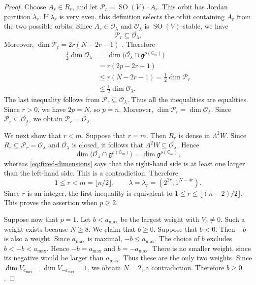 \documentclass[12pt]{article}
\theoremstyle{remark}
\theoremstyle{plain}
\newcommand{\Gm}{\mathbb G_m}
\begin{document}
\begin{proof}
Choose $A_r\in R_r$, and let
$\mathcal P_r=\operatorname{SO}(V)\cdot A_r$. This orbit has Jordan
partition $\lambda_r$. If $\lambda_r$ is very even, this definition
selects the orbit containing $A_r$ from the two possible orbits. Since
$A_r\in\overline{\mathcal O_\lambda}$ and
$\overline{\mathcal O_\lambda}$ is $\operatorname{SO}(V)$-stable, we
have
\[
\mathcal P_r\subseteq\overline{\mathcal O_\lambda}.
\]
Moreover,
$\dim\mathcal P_r=2r(N-2r-1)$ \cite{KP}. Therefore
\[
\begin{aligned}
\frac12\dim\mathcal O_\lambda
&=\dim\bigl(\overline{\mathcal O_\lambda}
\cap\mathfrak g^{\rho(\Gm)}\bigr)\\
&=r(2p-2r-1)\\
&\leq r(N-2r-1)
=\frac12\dim\mathcal P_r\\
&\leq\frac12\dim\mathcal O_\lambda.
\end{aligned}
\]
The last inequality follows from
$\mathcal P_r\subseteq\overline{\mathcal O_\lambda}$. Thus all the
inequalities are equalities. Since $r>0$, we have $2p=N$, so $p=n$.
Moreover,
$\dim\mathcal P_r=\dim\mathcal O_\lambda$. Since
$\mathcal P_r\subseteq\overline{\mathcal O_\lambda}$, we obtain
$\mathcal P_r=\mathcal O_\lambda$.

We next show that $r<m$. Suppose that $r=m$. Then $R_r$ is dense in
$\Lambda^2W$. Since
$R_r\subseteq\mathcal P_r=\mathcal O_\lambda$ and
$\overline{\mathcal O_\lambda}$ is closed, it follows that
$\Lambda^2W\subseteq\overline{\mathcal O_\lambda}$. Hence
\[
\dim\bigl(\overline{\mathcal O_\lambda}
\cap\mathfrak g^{\rho(\Gm)}\bigr)
=\dim\mathfrak g^{\rho(\Gm)},
\]
whereas \eqref{eq:fixed-dimensions} says that the right-hand side is
at least one larger than the left-hand side. This is a contradiction.
Therefore
\[
1\leq r<m=\lfloor n/2\rfloor,
\qquad
\lambda=\lambda_r=(2^{2r},1^{N-4r}).
\]
Since $r$ is an integer, the first inequality is equivalent to
$1\leq r\leq\lfloor(n-2)/2\rfloor$.
This proves the assertion when $p\geq2$.

Suppose now that $p=1$. Let $b<a_{\max}$ be the largest weight with
$V_b\ne0$. Such a weight exists because $N\geq8$. We claim that
$b\geq0$. Suppose that $b<0$. Then $-b$ is also a weight. Since
$a_{\max}$ is maximal, $-b\leq a_{\max}$. The choice of $b$ excludes
$b<-b<a_{\max}$. Hence $-b=a_{\max}$ and $b=-a_{\max}$.
There is no smaller weight, since its negative would be larger than
$a_{\max}$. Thus these are the only two weights. Since
$\dim V_{a_{\max}}=\dim V_{-a_{\max}}=1$, we obtain $N=2$, a
contradiction. Therefore $b\geq0$.


\end{proof}
\end{document}
